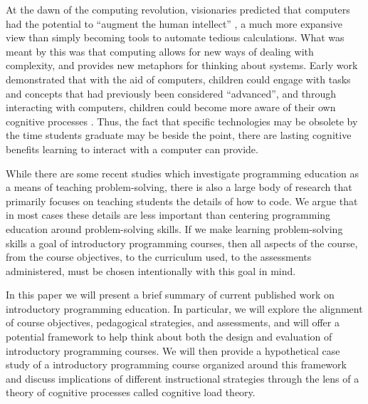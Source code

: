 \documentclass[12pt]{article}
\begin{document}
At the dawn of the computing revolution, visionaries predicted that
computers had the potential to ``augment the human intellect''
\autocite{engelbart_augmenting_1962}, a much more expansive view than
simply becoming tools to automate tedious calculations. What was meant
by this was that computing allows for new ways of dealing with
complexity, and provides new metaphors for thinking about
systems\autocite{kay_history_1996}. Early work demonstrated that with
the aid of computers, children could engage with tasks and concepts
that had previously been considered ``advanced'', and through
interacting with computers, children could become more aware of their
own cognitive processes \autocite{papert_mindstorms_1980}. Thus, the
fact that specific technologies may be obsolete by the time students
graduate may be beside the point, there are lasting cognitive benefits
learning to interact with a computer can provide.

While there are some recent studies which investigate programming
education as a means of teaching problem-solving, there is also a
large body of research that primarily focuses on teaching students the
details of how to code. We argue that in most cases these details are
less important than centering programming education around
problem-solving skills. If we make learning problem-solving skills a
goal of introductory programming courses, then all aspects of the
course, from the course objectives, to the curriculum used, to the
assessments administered, must be chosen intentionally with this goal
in mind. 

In this paper we will present a brief summary of current published
work on introductory programming education. In particular, we will
explore the alignment of course objectives, pedagogical strategies,
and assessments, and will offer a potential framework to help think
about both the design and evaluation of introductory programming
courses. We will then provide a hypothetical case study of a
introductory programming course organized around this framework and
discuss implications of different instructional strategies through the
lens of a theory of cognitive processes called cognitive load theory.


\end{document}
